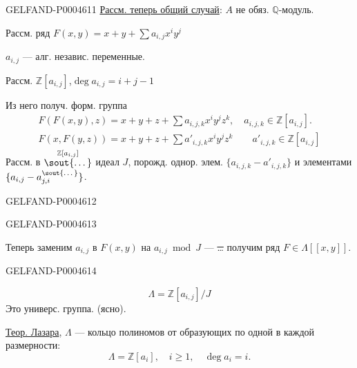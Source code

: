 \begin{GelfandAdjacentEvidence}{GELFAND-P000461}{1}
\underline{Рассм. теперь общий случай}: $A$ не обяз. $\mathbb Q$-модуль.

Рассм. ряд $F(x,y)=x+y+\sum a_{i,j}x^iy^j$

$a_{i,j}$ — алг. независ. переменные.

Рассм. $\mathbb Z[a_{i,j}]$,\quad $\deg a_{i,j}=i+j-1$

Из него получ. форм. группа
\[
\begin{gathered}
F(F(x,y),z)=x+y+z+\sum a_{i,j,k}x^iy^jz^k,\quad
a_{i,j,k}\in\mathbb Z[a_{i,j}].\\
F(x,F(y,z))=x+y+z+\sum a'_{i,j,k}x^iy^jz^k
\qquad a'_{i,j,k}\in\mathbb Z[a_{i,j}]
\end{gathered}
\]
Рассм. в $\overset{\mathbb Z[a_{i,j}]}{\text{\sout{\ldots}}}$ идеал
$J$, порожд. однор. элем. $\{a_{i,j,k}-a'_{i,j,k}\}$
и элементами $\{a_{i,j}-a_{j,i}^{\text{\sout{\ldots}}}\}$.
\end{GelfandAdjacentEvidence}
\begin{GelfandAdjacentEvidence}{GELFAND-P000461}{2}

\end{GelfandAdjacentEvidence}
\begin{GelfandAdjacentEvidence}{GELFAND-P000461}{3}


Теперь заменим $a_{i,j}$ в $F(x,y)$ на $a_{i,j}\bmod J$ —
\sout{\ldots} получим ряд $F\in\Lambda[[x,y]]$.
\end{GelfandAdjacentEvidence}
\begin{GelfandAdjacentEvidence}{GELFAND-P000461}{4}

\[
\Lambda=\mathbb Z[a_{i,j}]/J
\]
Это универс. группа. (ясно).

\underline{Теор. Лазара}, $\Lambda$ — кольцо полиномов от образующих по одной в каждой размерности:
\[
\Lambda=\mathbb Z[a_i],\quad i\ge1,\quad\deg a_i=i.
\]
\end{GelfandAdjacentEvidence}
